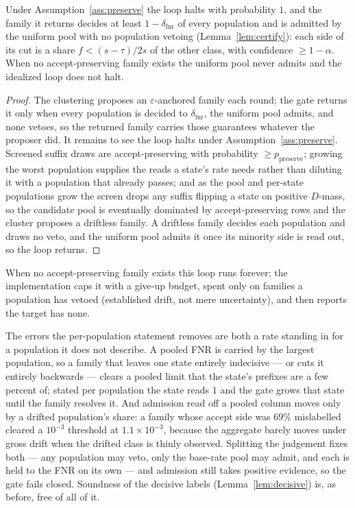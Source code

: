 \begin{theorem}\label{thm:cut}
Under Assumption~\ref{ass:preserve} the loop halts with probability $1$, and the family
it returns decides at least $1-\delta_{\mathrm{fnr}}$ of every population and is admitted
by the uniform pool with no population vetoing (Lemma~\ref{lem:certify}): each side of its
cut is a share $f<(s-\tau)/2s$ of the other class, with confidence $\ge1-\alpha$. When no
accept-preserving family exists the uniform pool never admits and the idealized loop does
not halt.
\end{theorem}
\begin{proof}
The clustering proposes an $\varepsilon$-anchored family each round; the gate returns it
only when every population is decided to $\delta_{\mathrm{fnr}}$, the uniform pool admits,
and none vetoes, so the returned family carries those guarantees whatever the proposer
did. It remains to see the loop halts under Assumption~\ref{ass:preserve}. Screened suffix
draws are accept-preserving with probability $\ge p_{\mathrm{preserve}}$; growing the
worst population supplies the reads a state's rate needs rather than diluting it with a
population that already passes; and as the pool and per-state populations grow the screen
drops any suffix flipping a state on positive $D$-mass, so the candidate pool is
eventually dominated by accept-preserving rows and the cluster proposes a driftless
family. A driftless family decides each population and draws no veto, and the uniform pool
admits it once its minority side is read out, so the loop returns.
\end{proof}

When no accept-preserving family exists this loop runs forever; the implementation caps
it with a give-up budget, spent only on families a population has vetoed (established
drift, not mere uncertainty), and then reports the target has none.

The errors the per-population statement removes are both a rate standing in for a
population it does not describe. A pooled FNR is carried by the largest population, so a
family that leaves one state entirely indecisive --- or cuts it entirely backwards ---
clears a pooled limit that the state's prefixes are a few percent of; stated per
population the state reads $1$ and the gate grows that state until the family resolves it.
And admission read off a pooled column moves only by a drifted population's share: a
family whose accept side was $69\%$ mislabelled cleared a $10^{-3}$ threshold at
$1.1\times10^{-3}$, because the aggregate barely moves under gross drift when the drifted
class is thinly observed. Splitting the judgement fixes both --- any population may veto,
only the base-rate pool may admit, and each is held to the FNR on its own --- and
admission still takes positive evidence, so the gate fails closed. Soundness of the
decisive labels (Lemma~\ref{lem:decisive}) is, as before, free of all of it.

